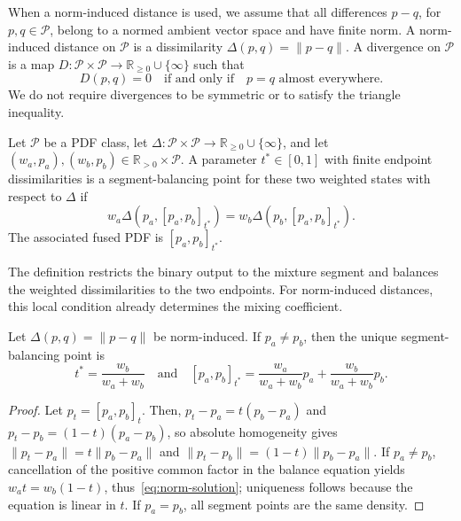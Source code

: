 \documentclass[runningheads]{llncs}
\newcommand{\R}{\mathbb{R}}
\newcommand{\Pcal}{\mathcal{P}}
\newcommand{\norm}[1]{\lVert #1\rVert}
\begin{document}
When a norm-induced distance is used, we assume that all differences
$p-q$, for $p,q\in\Pcal$, belong to a normed ambient vector space and have
finite norm. A norm-induced distance on $\Pcal$ is a dissimilarity
$\Delta(p,q)=\norm{p-q}$. A divergence on $\Pcal$ is a map
$D:\Pcal\times\Pcal\to\R_{\geq0}\cup\{\infty\}$ such that
\begin{equation}
 D(p,q)=0 \quad\text{if and only if}\quad p=q \text{ almost everywhere}.
 \label{eq:div-separation}
 \end{equation}
We do not require divergences to be symmetric or to
satisfy the triangle inequality.

\begin{definition} \label{def:segment-balance}
Let $\Pcal$ be a PDF class, let
$\Delta:\Pcal\times\Pcal\to\R_{\geq0}\cup\{\infty\}$, and let
$(w_a,p_a),(w_b,p_b)\in\R_{>0}\times\Pcal$. A parameter
$t^*\in[0,1]$ with finite endpoint dissimilarities is a segment-balancing point
for these two weighted states with respect to $\Delta$ if
\begin{equation}
  w_a\Delta(p_a,[p_a,p_b]_{t^*})
  =
  w_b\Delta(p_b,[p_a,p_b]_{t^*}).
  \label{eq:balance}
\end{equation}
The associated fused PDF is $[p_a,p_b]_{t^*}$.
\end{definition}

The definition restricts the binary output to the mixture segment and balances
the weighted dissimilarities to the two endpoints. For norm-induced distances,
this local condition already determines the mixing coefficient.

\begin{theorem}
\label{thm:norm-characterization}
Let $\Delta(p,q)=\norm{p-q}$ be norm-induced. If $p_a\neq p_b$, then the unique segment-balancing point is
\begin{equation}
  t^*=\frac{w_b}{w_a+w_b}
  \quad\text{and}\quad
  [p_a,p_b]_{t^*}
  =
  \frac{w_a}{w_a+w_b}p_a+
  \frac{w_b}{w_a+w_b}p_b.
  \label{eq:norm-solution}
\end{equation}
\end{theorem}

\begin{proof}
Let $p_t=[p_a,p_b]_t$. Then, $p_t-p_a=t(p_b-p_a)$ and $p_t-p_b=(1-t)(p_a-p_b)$, so absolute homogeneity gives $\norm{p_t-p_a}=t\norm{p_b-p_a}$ and $\norm{p_t-p_b}=(1-t)\norm{p_b-p_a}$. If $p_a\neq p_b$, cancellation of the positive common factor in the balance equation yields $w_at=w_b(1-t)$, thus~\eqref{eq:norm-solution}; uniqueness follows because the equation is linear in $t$. If $p_a=p_b$, all segment points are the same density.
\end{proof}
\end{document}

